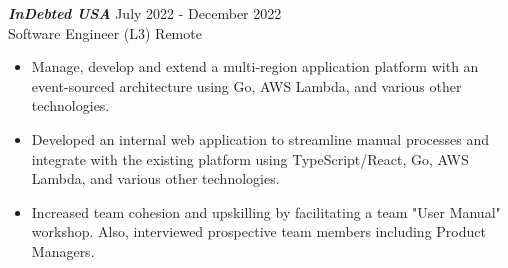 {\sl \textbf{InDebted USA}} \hfill July 2022 - December 2022 \\ Software Engineer (L3) \hfill Remote
\begin{itemize}
    \item Manage, develop and extend a multi-region application platform with an event-sourced architecture using Go, AWS Lambda, and various other technologies.
    \item Developed an internal web application to streamline manual processes and integrate with the existing platform using TypeScript/React, Go, AWS Lambda, and various other technologies.
    \item Increased team cohesion and upskilling by facilitating a team "User Manual" workshop. Also, interviewed prospective team members including Product Managers.
\end{itemize}
